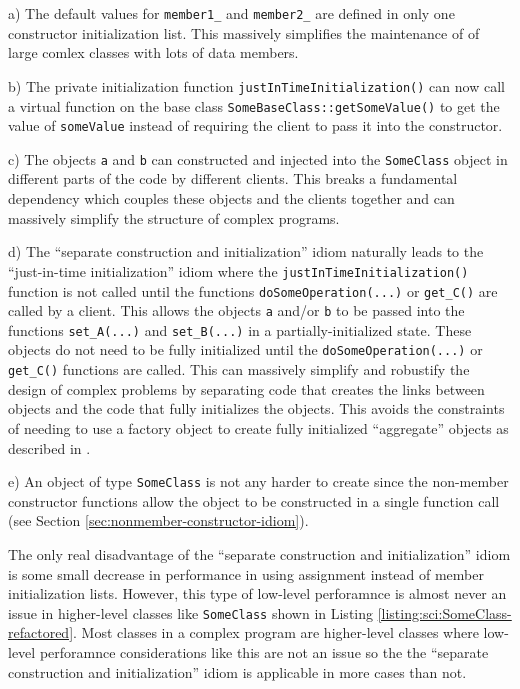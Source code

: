 \documentclass[pdf,ps2pdf,11pt]{SANDreport}
\begin{document}
a) The default values for {}\texttt{member1\_} and
{}\texttt{member2\_} are defined in only one constructor
initialization list.  This massively simplifies the maintenance of of
large comlex classes with lots of data members.

b) The private initialization function
{}\texttt{justInTimeInitialization()} can now call a virtual function on
the base class {}\texttt{SomeBaseClass::getSomeValue()} to get the
value of {}\texttt{someValue} instead of requiring the client to pass
it into the constructor.

c) The objects {}\texttt{a} and {}\texttt{b} can constructed and
injected into the {}\texttt{SomeClass} object in different parts of
the code by different clients.  This breaks a fundamental dependency
which couples these objects and the clients together and can massively
simplify the structure of complex programs.

d) The ``separate construction and initialization'' idiom naturally
leads to the ``just-in-time initialization'' idiom where the
{}\texttt{justInTimeInitialization()} function is not called until the
functions {}\texttt{doSomeOperation(...)} or {}\texttt{get\_C()} are
called by a client.  This allows the objects {}\texttt{a} and/or
{}\texttt{b} to be passed into the functions {}\texttt{set\_A(...)} 
and {}\texttt{set\_B(...)} in a partially-initialized state.  These
objects do not need to be fully initialized until the
{}\texttt{doSomeOperation(...)} or {}\texttt{get\_C()} functions are
called.  This can massively simplify and robustify the design of
complex problems by separating code that creates the links between
objects and the code that fully initializes the objects.  This avoids
the constraints of needing to use a factory object to create fully
initialized ``aggregate'' objects as described in
{}\cite{DomainDrivenDesign}.

e) An object of type {}\texttt{SomeClass} is not any harder to create
since the non-member constructor functions allow the object to be
constructed in a single function call (see Section
{}\ref{sec:nonmember-constructor-idiom}).

The only real disadvantage of the ``separate construction and
initialization'' idiom is some small decrease in performance in using
assignment instead of member initialization lists.  However, this type
of low-level perforamnce is almost never an issue in higher-level
classes like {}\texttt{SomeClass} shown in Listing
{}\ref{listing:sci:SomeClass-refactored}.  Most classes in a complex
program are higher-level classes where low-level perforamnce
considerations like this are not an issue so the the ``separate
construction and initialization'' idiom is applicable in more cases
than not.
\end{document}
